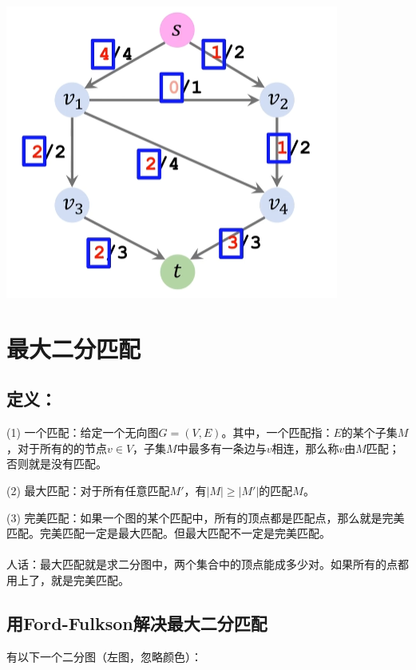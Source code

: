 \documentclass[a4paper]{article}    %
\begin{document}
\begin{center}
    \includegraphics[scale=0.5]{34.png}
\end{center}

\section{最大二分匹配}

\subsection{定义：}

\noindent (1) 一个匹配：给定一个无向图$G=(V,E)$。其中，一个匹配指：$E$的某个子集$M$，对于所有的的节点$v\in V$，子集$M$中最多有一条边与$v$相连，那么称$v$由$M$匹配；否则就是没有匹配。

\noindent (2) 最大匹配：对于所有任意匹配$M'$，有$|M|\geq|M'|$的匹配$M$。

\noindent (3) 完美匹配：如果一个图的某个匹配中，所有的顶点都是匹配点，那么就是完美匹配。完美匹配一定是最大匹配。但最大匹配不一定是完美匹配。
\\
\\
人话：最大匹配就是求二分图中，两个集合中的顶点能成多少对。如果所有的点都用上了，就是完美匹配。

\subsection{用Ford-Fulkson解决最大二分匹配}

有以下一个二分图（左图，忽略颜色）：
\end{document}
